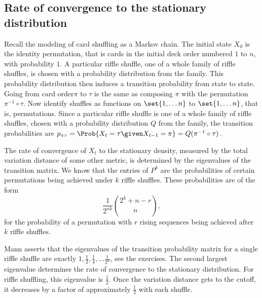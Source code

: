 \documentclass[12pt]{article}
\begin{document}
\subsection*{Rate of convergence to the stationary distribution}

Recall the modeling of card shuffling as a Markov chain.  The initial
state \( X_0 \) is the identity permutation, that is cards in the
initial deck order numbered \( 1 \) to \( n \), with probability \( 1 \).
A particular riffle shuffle, one of a whole family of riffle shuffles,
is chosen with a probability distribution from the family. This
probability distribution then induces a transition probability from
state to state.  Going from card order\( \pi \) to \( \tau \) is the
same as composing \( \pi \) with the permutation \( \pi^{-1} \circ \tau \).
Now identify shuffles as functions on \( \set{1, \dots n} \) to \( \set{1,
\dots n} \), that is, permutations.  Since a particular riffle shuffle
is one of a whole family of riffle shuffles, chosen with a probability
distribution \( Q \) from the family, the transition probabilities are \(
p_{\pi \tau} = \Prob{X_t = \tau \given X_{t-1} = \pi} = Q(\pi^{-1} \circ
\tau) \).

The rate of convergence of \( X_t \) to the stationary density, measured
by the total variation distance of some other metric, is determined by
the eigenvalues of the transition matrix.  We know that the entries of \(
P^k \) are the probabilities of certain permutations being achieved
under \( k \) riffle shuffles.  These probabilities are of the form
\[
    \frac{1}{2^{nk}} \binom{2^k +n - r}{n},
\] for the probability of a permutation with \( r \) rising sequences
being achieved after \( k \) riffle shuffles.

Mann
\cite{mann94} asserts that the eigenvalues of the transition probability
matrix for a single riffle shuffle are exactly \( 1, \frac{1}{2}, \frac{1}
{4}, \dots \frac{1}{2^n} \), see the exercises.  The second largest
eigenvalue determines the rate of convergence to the stationary
distribution.  For riffle shuffling, this eigenvalue is \( \frac{1}{2} \).
Once the variation distance gets to the cutoff, it decreases by a factor
of approximately \( \frac{1}{2} \) with each shuffle.
\end{document}
